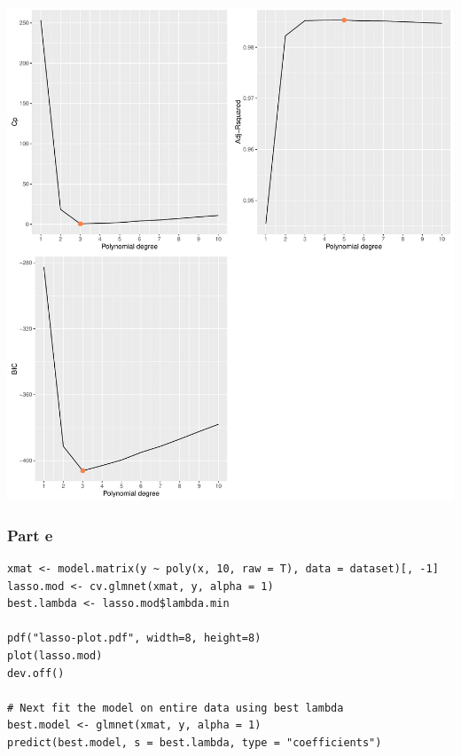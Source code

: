\documentclass[11pt, a4paper]{article}
\begin{document}
\includegraphics[scale=0.55]{Bwd-BIC-AR2-Cp.pdf}
\subsubsection{Part e}
\label{sec-2-1-4}


\begin{verbatim}
xmat <- model.matrix(y ~ poly(x, 10, raw = T), data = dataset)[, -1]
lasso.mod <- cv.glmnet(xmat, y, alpha = 1)
best.lambda <- lasso.mod$lambda.min

pdf("lasso-plot.pdf", width=8, height=8)
plot(lasso.mod)
dev.off()

# Next fit the model on entire data using best lambda
best.model <- glmnet(xmat, y, alpha = 1)
predict(best.model, s = best.lambda, type = "coefficients")
\end{verbatim}
\end{document}
